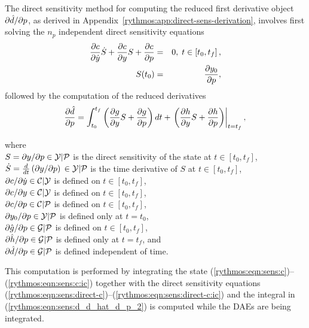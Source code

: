 \documentclass[pdf,ps2pdf,11pt]{SANDreport}
\begin{document}
The direct sensitivity method for computing the reduced first derivative
object $\partial \hat{d} / \partial p$, as derived in
Appendix~\ref{rythmos:app:direct-sens-derivation}, involves first solving the
$n_p$ independent direct sensitivity equations
%
\begin{eqnarray}
%
\Jac{c}{\dot{y}} \dot{S} + \Jac{c}{y} S + \Jac{c}{p}
& = & 0, \; t \in \left[ t_0, t_f \right], \label{rythmos:eqn:sens:direct-c} \\
S(t_0) & = & \Jac{y_0}{p}, \label{rythmos:eqn:sens:direct-c:ic}
\end{eqnarray}
%
followed by the computation of the reduced derivatives
%
\begin{equation}
\displaystyle{\frac{\partial \hat{d}}{\partial p}} 
= \int_{t_0}^{t_f} \left( \displaystyle{\frac{\partial g}{\partial y}} S +  \displaystyle{\frac{\partial g}{\partial p}} \right) dt
+ \left. \left(  \displaystyle{\frac{\partial h}{\partial y}} S + \displaystyle{\frac{\partial h}{\partial p}} \right) \right|_{t=t_f},
\label{rythmos:eqn:sens:d_d_hat_d_p_2}
\end{equation}
%
\begin{tabbing}
\hspace{4ex}where\hspace{1ex}\= \\
\> $S = \partial y / \partial p {}\in {}\mathcal{Y}|\mathcal{P}$ is the
direct sensitivity of the state at $t\in[t_0,t_f]$, \\
\> $\dot{S} = \frac{d}{dt}\left(\partial y / \partial p\right)
{}\in {}\mathcal{Y}|\mathcal{P}$ is the time derivative of $S$ at $t\in[t_0,t_f]$, \\
\> $\partial c / \partial {}\dot{y} {}\in {}\mathcal{C}|\mathcal{Y}$ is defined on
$t\in[t_0,t_f]$, \\
\> $\partial c / \partial y {}\in {}\mathcal{C}|\mathcal{Y}$ is defined on $t\in[t_0,t_f]$, \\
\> $\partial c / \partial p {}\in {}\mathcal{C}|\mathcal{P}$ is defined on $t\in[t_0,t_f]$, \\
\> $\partial y_0 / \partial p {}\in {}\mathcal{Y}|\mathcal{P}$ is defined only at $t=t_0$, \\
\> $\partial {}\hat{g} / \partial p {}\in {}\mathcal{G}|\mathcal{P}$ is defined on $t\in[t_0,t_f]$, \\
\> $\partial {}\hat{h} / \partial p {}\in {}\mathcal{G}|\mathcal{P}$ is defined only at $t=t_f$, and \\
\> $\partial {}\hat{d} / \partial p {}\in {}\mathcal{G}|\mathcal{P}$ is defined independent of time.
\end{tabbing}

This computation is performed by integrating the state
(\ref{rythmos:eqn:sens:c})--(\ref{rythmos:eqn:sens:c:ic}) together with the
direct sensitivity equations
(\ref{rythmos:eqn:sens:direct-c})--(\ref{rythmos:eqn:sens:direct-c:ic}) and
the integral in (\ref{rythmos:eqn:sens:d_d_hat_d_p_2}) is computed while the
DAEs are being integrated.
\end{document}
